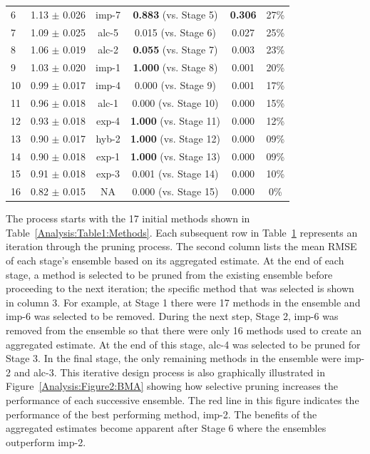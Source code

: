 \documentclass[journal=jpcbfk, manuscript=article]{achemso}
\newcommand{\+}[1]{\ensuremath{\mathbf{#1}}}
\begin{document}
\begin{table}[t!]
\begin{tabular}{l|c|c|c|c|c}
		 6 & 1.13 $\pm$ 0.026 & imp-7 & \textbf{0.883}  (vs. Stage 5)& \textbf{0.306} & 27\%\\
		 7 & 1.09 $\pm$ 0.025 & alc-5 & 0.015  (vs. Stage 6) &  0.027 & 25\%\\
		 8 & 1.06 $\pm$ 0.019 & alc-2 & \textbf{0.055}  (vs. Stage 7) & 0.003 & 23\%\\
		 9 & 1.03 $\pm$ 0.020 & imp-1 & \textbf{1.000}  (vs. Stage 8)& 0.001 & 20\%\\
		 10 & 0.99 $\pm$ 0.017 & imp-4 & 0.000  (vs. Stage 9)& 0.001 & 17\%\\
		 11 & 0.96 $\pm$ 0.018 & alc-1 & 0.000  (vs. Stage 10) & 0.000 & 15\%\\														
		 12 & 0.93 $\pm$ 0.018 & exp-4 &  \textbf{1.000}  (vs. Stage 11)& 0.000 & 12\%\\
		 13 & 0.90 $\pm$ 0.017 & hyb-2 & \textbf{1.000}  (vs. Stage 12) &0.000 &  09\%\\															
		 14 & 0.90 $\pm$ 0.018 & exp-1 & \textbf{1.000}   (vs. Stage 13)& 0.000 & 09\%\\															
		 15 & 0.91 $\pm$ 0.018 & exp-3 &   0.001 (vs. Stage 14)&  0.000  & 10\%\\																
		 16 & 0.82 $\pm$ 0.015 & NA  & 0.000   (vs. Stage 15)&0.000 &  0\%\\
		\hline
		\hline
	\end{tabular}
	\label{Analysis:Table2:BMA}
\end{table}
The process starts with the 17 initial methods shown in Table~\ref{Analysis:Table1:Methods}.
Each subsequent row in Table~\ref{Analysis:Table2:BMA} represents an iteration through the pruning process.
The second column lists the mean RMSE of each stage's ensemble based on its aggregated estimate.
At the end of each stage, a method is selected to be pruned from the existing ensemble before proceeding to the next iteration; the specific method that was selected is shown in column 3.
For example, at Stage 1 there were 17 methods in the ensemble and imp-6 was selected to be removed.
During the next step, Stage 2, imp-6 was removed from the ensemble so that there were only 16 methods used to create an aggregated estimate.
At the end of this stage, alc-4 was selected to be pruned for Stage 3.
In the final stage, the only remaining methods in the ensemble were imp-2 and alc-3.
This iterative design process is also graphically illustrated in Figure~\ref{Analysis:Figure2:BMA} showing how selective pruning increases the performance of each successive ensemble.
The red line in this figure indicates the performance of the best performing method, imp-2.
The benefits of the aggregated estimates become apparent after Stage 6 where the ensembles outperform imp-2.
\end{document}
